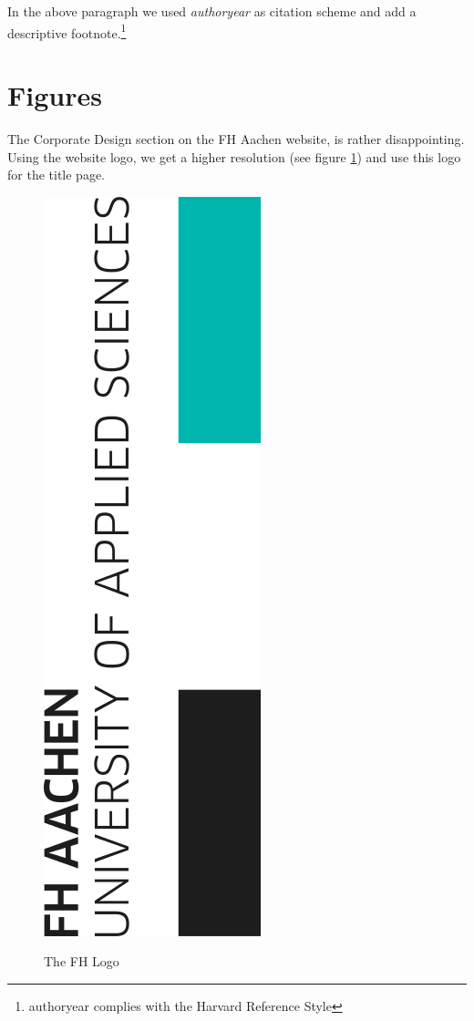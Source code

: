 In the above paragraph we used \textit{authoryear} as citation scheme and add a descriptive footnote.\footnote{authoryear complies with the Harvard Reference Style}\par

\section{Figures}
The Corporate Design section on the FH Aachen website, is rather disappointing. Using the website logo, we get a higher resolution (see figure \ref{figure:fhLogo}) and use this logo for the title page.
\begin{figure}[htbp] %
	\caption{The FH Logo \autocite[]{Online:FhAachen}}
	\includegraphics[scale=0.7]{figures/FHLogoFromSVG.png}
	\label{figure:fhLogo} %
\end{figure}


